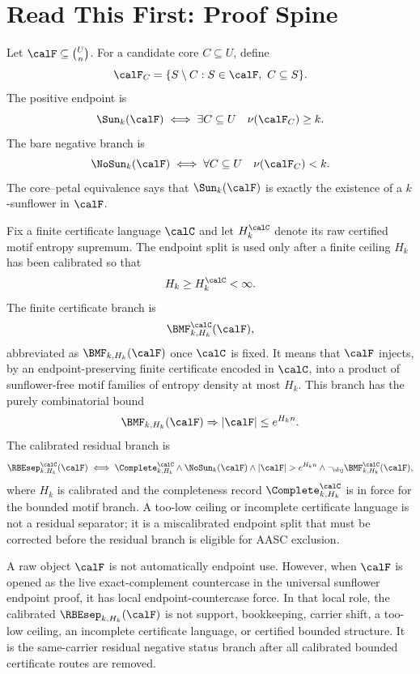 \documentclass[11pt]{article}
\begin{document}
\tableofcontents

\section{Read This First: Proof Spine}

Let \(\calF\subseteq \binom{U}{n}\).  For a candidate core \(C\subseteq U\), define
\[
  \calF_C=\{S\setminus C:S\in\calF,\ C\subseteq S\}.
\]
The positive endpoint is
\[
  \Sun_k(\calF)\iff \exists C\subseteq U\quad \nu(\calF_C)\ge k.
\]
The bare negative branch is
\[
  \NoSun_k(\calF)\iff \forall C\subseteq U\quad \nu(\calF_C)<k.
\]
The core--petal equivalence says that \(\Sun_k(\calF)\) is exactly the existence of a \(k\)-sunflower in \(\calF\).

Fix a finite certificate language \(\calC\) and let \(H_k^{\calC}\) denote its raw certified motif entropy supremum.  The endpoint split is used only after a finite ceiling \(H_k\) has been calibrated so that
\[
  H_k\ge H_k^{\calC}<\infty.
\]
The finite certificate branch is
\[
  \BMF^{\calC}_{k,H_k}(\calF),
\]
abbreviated as \(\BMF_{k,H_k}(\calF)\) once \(\calC\) is fixed.  It means that \(\calF\) injects, by an endpoint-preserving finite certificate encoded in \(\calC\), into a product of sunflower-free motif families of entropy density at most \(H_k\).  This branch has the purely combinatorial bound
\[
  \BMF_{k,H_k}(\calF)\Rightarrow |\calF|\le e^{H_k n}.
\]
The calibrated residual branch is
\[
  \RBEsep^{\calC}_{k,H_k}(\calF)
  \iff
  \Complete^{\calC}_{k,H_k}
  \wedge
  \NoSun_k(\calF)
  \wedge |\calF|>e^{H_k n}
  \wedge \neg_{\mathrm{obj}}\BMF^{\calC}_{k,H_k}(\calF),
\]
where \(H_k\) is calibrated and the completeness record \(\Complete^{\calC}_{k,H_k}\) is in force for the bounded motif branch.  A too-low ceiling or incomplete certificate language is not a residual separator; it is a miscalibrated endpoint split that must be corrected before the residual branch is eligible for AASC exclusion.

A raw object \(\calF\) is not automatically endpoint use.  However, when \(\calF\) is opened as the live exact-complement countercase in the universal sunflower endpoint proof, it has local endpoint-countercase force.  In that local role, the calibrated \(\RBEsep_{k,H_k}(\calF)\) is not support, bookkeeping, carrier shift, a too-low ceiling, an incomplete certificate language, or certified bounded structure.  It is the same-carrier residual negative status branch after all calibrated bounded certificate routes are removed.
\end{document}
